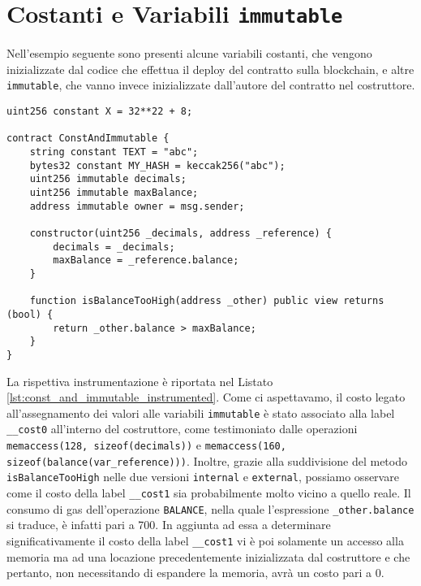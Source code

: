 \documentclass[12pt,a4paper,openright,oneside]{report}
\theoremstyle{definition}
\begin{document}
\section{Costanti e Variabili \texttt{immutable}}
Nell'esempio seguente sono presenti alcune variabili costanti, che vengono inizializzate dal codice che effettua il deploy del contratto sulla blockchain, e altre \texttt{immutable}, che vanno invece inizializzate dall'autore del contratto nel costruttore.
\begin{lstlisting}[language=Solidity,caption={Esempio Solidity con variabili \texttt{const} e \texttt{immutable}},label={lst:const_and_immutable},frame=tlrb]
uint256 constant X = 32**22 + 8;

contract ConstAndImmutable {
    string constant TEXT = "abc";
    bytes32 constant MY_HASH = keccak256("abc");
    uint256 immutable decimals;
    uint256 immutable maxBalance;
    address immutable owner = msg.sender;

    constructor(uint256 _decimals, address _reference) {
        decimals = _decimals;
        maxBalance = _reference.balance;
    }

    function isBalanceTooHigh(address _other) public view returns (bool) {
        return _other.balance > maxBalance;
    }
}
\end{lstlisting}
La rispettiva instrumentazione \`{e} riportata nel Listato \ref{lst:const_and_immutable_instrumented}. Come ci aspettavamo, il costo legato all'assegnamento dei valori alle variabili \texttt{immutable} \`{e} stato associato alla label \texttt{\_\_cost0} all'interno del costruttore, come testimoniato dalle operazioni \texttt{memaccess(128, sizeof(decimals))} e \texttt{memaccess(160, sizeof(balance(var\_reference)))}. Inoltre, grazie alla suddivisione del metodo \texttt{isBalanceTooHigh} nelle due versioni \texttt{internal} e \texttt{external}, possiamo osservare come il costo della label \texttt{\_\_cost1} sia probabilmente molto vicino a quello reale. Il consumo di gas dell'operazione \texttt{BALANCE}, nella quale l'espressione \texttt{\_other.balance} si traduce, \`{e} infatti pari a 700. In aggiunta ad essa a determinare significativamente il costo della label \texttt{\_\_cost1} vi \`{e} poi solamente un accesso alla memoria ma ad una locazione precedentemente inizializzata dal costruttore e che pertanto, non necessitando di espandere la memoria, avr\`{a} un costo pari a 0.
\end{document}
